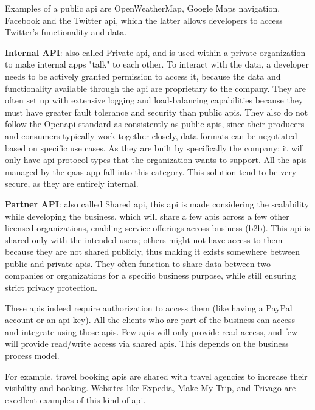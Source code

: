 \begin{multicols}{2}
      Examples of a public \acrshort{api} are OpenWeatherMap, Google Maps navigation, Facebook and the Twitter \acrshort{api},
      which the latter allows  developers to access Twitter's functionality and data.

      \textbf{Internal API}: also called Private \acrshort{api}, and is used within a private organization to make internal
      apps "talk" to each other. To interact with the data, a developer needs to be actively granted permission to access it,
      because the data and functionality available through the \acrshort{api} are proprietary to the company. They are often
      set up with extensive logging and load-balancing capabilities because they must have greater fault tolerance and
      security than public \acrshort{api}s. They also do not follow the Open\acrshort{api} standard as consistently
      as public \acrshort{api}s, since their producers and consumers typically work together closely, data formats
      can be negotiated based on specific use cases. As they are built by specifically the company; it will only have
      \acrshort{api} protocol types that the organization wants to support. All the \acrshort{api}s managed by the
      \acrshort{qaas} app fall into this category. This solution tend to be very secure, as they are entirely internal.

      \textbf{Partner API}: also called Shared \acrshort{api}, this \acrshort{api} is made considering the scalability
      while developing the business, which will share a few \acrshort{api}s across a few other licensed organizations,
      enabling service offerings across business (\acrshort{b2b}). This \acrshort{api} is shared only with the intended
      users; others might not have access to them because they are not shared publicly, thus making it exists somewhere
      between public and private \acrshort{api}s. They often function to share data between two companies or organizations
      for a specific business purpose, while still ensuring strict privacy protection.

      These \acrshort{api}s indeed require authorization to access them (like having a PayPal account or an \acrshort{api}
      key). All the clients who are part of the business can access and integrate using those \acrshort{api}s. Few
      \acrshort{api}s will only provide read access, and few will provide read/write access via shared \acrshort{api}s.
      This depends on the business process model.

      For example, travel booking \acrshort{api}s are shared with travel agencies to increase their visibility and
      booking. Websites like Expedia, Make My Trip, and Trivago are excellent examples of this kind of \acrshort{api}.


\end{multicols}

